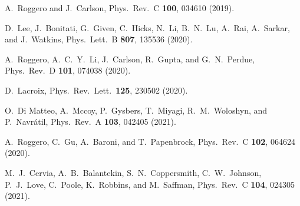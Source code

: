 \documentclass[aps,prc,reprint,superscriptaddress,nofootinbib]{revtex4-2}
\begin{document}
\begin{thebibliography}{999}
A.~Roggero and J.~Carlson,
Phys.\ Rev.\ C \textbf{100}, 034610 (2019).

D.~Lee, J.~Bonitati, G.~Given, C.~Hicks, N.~Li, B.~N.~Lu, A.~Rai, A.~Sarkar, and J.~Watkins,
Phys.\ Lett.\ B \textbf{807}, 135536 (2020).

A.~Roggero, A.~C.~Y.~Li, J.~Carlson, R.~Gupta, and G.~N.~Perdue,
Phys.\ Rev.\ D \textbf{101}, 074038 (2020).

D.~Lacroix,
Phys.\ Rev.\ Lett.\ \textbf{125}, 230502 (2020).

O.~Di Matteo, A.~Mccoy, P.~Gysbers, T.~Miyagi, R.~M.~Woloshyn, and P.~Navr\'atil,
Phys.\ Rev.\ A \textbf{103}, 042405 (2021).

A.~Roggero, C.~Gu, A.~Baroni, and T.~Papenbrock,
Phys.\ Rev.\ C \textbf{102}, 064624 (2020).

M.~J.~Cervia, A.~B.~Balantekin, S.~N.~Coppersmith, C.~W.~Johnson, P.~J.~Love, C.~Poole, K.~Robbins, and M.~Saffman,
Phys.\ Rev.\ C \textbf{104}, 024305 (2021).


\end{thebibliography}
\end{document}

